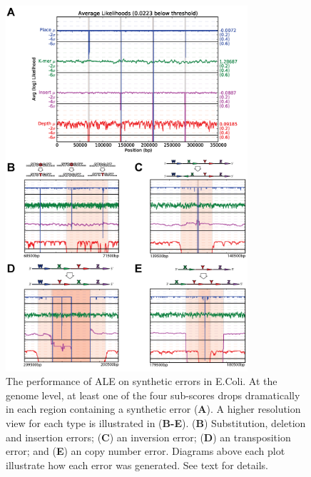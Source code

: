 \documentclass[phd,tocprelim]{cornell}
\begin{document}
\begin{figure}[!tpb]%
    \centerline{\includegraphics[width=0.8\textwidth]{figures/ALE/Clark_Fig2b.png}}
    \caption[ALE performance on with synthetic reads]{The performance of ALE on synthetic errors in E.Coli. At the genome level, at least one of the four sub-scores drops dramatically in each region containing a synthetic error ({\bf A}). A higher resolution view for each type is illustrated in ({\bf B-E}). ({\bf B}) Substitution, deletion and insertion errors; ({\bf C}) an inversion error; ({\bf D}) an transposition error; and ({\bf E}) an copy number error. Diagrams above each plot illustrate how each error was generated. See text for details.}\label{ALEfig2}
\end{figure}
\end{document}
